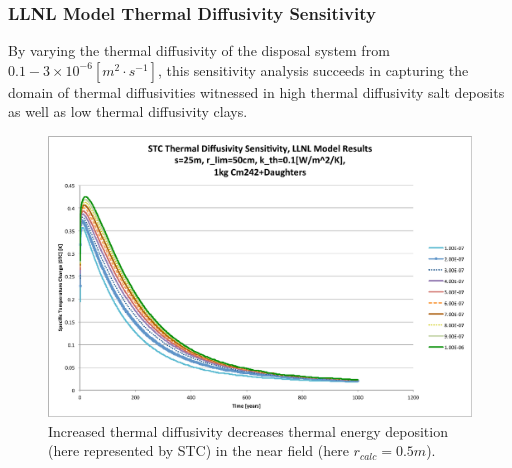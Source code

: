 
\begin{frame}[ctb!]
\frametitle{LLNL Model Thermal Diffusivity Sensitivity}
\footnotesize{
By varying the thermal diffusivity of the disposal system from $0.1-3\times 
10^{-6} [m^2\cdot s^{-1}]$, this sensitivity analysis succeeds in capturing the domain of 
thermal diffusivities witnessed in high thermal diffusivity salt deposits as 
well as low thermal diffusivity clays.

\begin{figure}[htbp!]
\begin{center}
\includegraphics[height=0.7\textheight]{./thermal_demonstration/diffusivity/Cm242alpha_kth_low.eps}
\end{center}
\caption[$K_{th}$ Sensitivity to $\alpha_{th}$ for $k_{th}$]{Increased thermal diffusivity decreases thermal energy deposition 
(here represented by STC) in the near field (here $r_{calc} = 0.5m$).}
\label{fig:Cm242alpha_kth_low}
\end{figure}
}
\end{frame}


